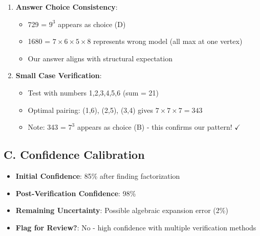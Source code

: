 \documentclass[]{article}
\begin{document}
\begin{verificationbox}
\begin{enumerate}
    \item \textbf{Answer Choice Consistency}:
    \begin{itemize}
        \item 729 = $9^3$ appears as choice (D)
        \item 1680 = $7 \times 6 \times 5 \times 8$ represents wrong model (all max at one vertex)
        \item Our answer aligns with structural expectation
    \end{itemize}
    
    \item \textbf{Small Case Verification}:
    \begin{itemize}
        \item Test with numbers 1,2,3,4,5,6 (sum = 21)
        \item Optimal pairing: (1,6), (2,5), (3,4) gives $7 \times 7 \times 7 = 343$
        \item Note: 343 = $7^3$ appears as choice (B) - this confirms our pattern! $\checkmark$
    \end{itemize}
\end{enumerate}

\subsection*{C. Confidence Calibration}
\begin{itemize}[leftmargin=*]
    \item \textbf{Initial Confidence}: 85\% after finding factorization
    \item \textbf{Post-Verification Confidence}: 98\%
    \item \textbf{Remaining Uncertainty}: Possible algebraic expansion error (2\%)
    \item \textbf{Flag for Review?}: No - high confidence with multiple verification methods
\end{itemize}
\end{verificationbox}
\end{document}
